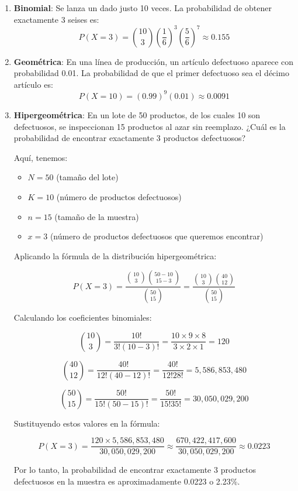 \documentclass[letterpaper, 12pt]{article}
\begin{document}
	\begin{enumerate}
		\item \textbf{Binomial}: Se lanza un dado justo 10 veces. La probabilidad de obtener exactamente 3 seises es:
		\[ P(X = 3) = \binom{10}{3} \left(\frac{1}{6}\right)^3 \left(\frac{5}{6}\right)^7 \approx 0.155 \]
		
		\item \textbf{Geométrica}: En una línea de producción, un artículo defectuoso aparece con probabilidad 0.01. La probabilidad de que el primer defectuoso sea el décimo artículo es:
		\[ P(X = 10) = (0.99)^9 (0.01) \approx 0.0091 \]
		
		\item \textbf{Hipergeométrica}: En un lote de 50 productos, de los cuales 10 son defectuosos, se inspeccionan 15 productos al azar sin reemplazo. ¿Cuál es la probabilidad de encontrar exactamente 3 productos defectuosos?
		
		Aquí, tenemos:
		\begin{itemize}
			\item $N = 50$ (tamaño del lote)
			\item $K = 10$ (número de productos defectuosos)
			\item $n = 15$ (tamaño de la muestra)
			\item $x = 3$ (número de productos defectuosos que queremos encontrar)
		\end{itemize}
		
		Aplicando la fórmula de la distribución hipergeométrica:
		
		$$
		P(X=3) = \frac{\binom{10}{3} \binom{50-10}{15-3}}{\binom{50}{15}} = \frac{\binom{10}{3} \binom{40}{12}}{\binom{50}{15}}
		$$
		
		Calculando los coeficientes binomiales:
		
		$$
		\binom{10}{3} = \frac{10!}{3!(10-3)!} = \frac{10 \times 9 \times 8}{3 \times 2 \times 1} = 120
		$$
		
		$$
		\binom{40}{12} = \frac{40!}{12!(40-12)!} = \frac{40!}{12!28!} = 5,586,853,480
		$$
		
		$$
		\binom{50}{15} = \frac{50!}{15!(50-15)!} = \frac{50!}{15!35!} = 30,050,029,200
		$$
		
		Sustituyendo estos valores en la fórmula:
		
		$$
		P(X=3) = \frac{120 \times 5,586,853,480}{30,050,029,200} \approx \frac{670,422,417,600}{30,050,029,200} \approx 0.0223
		$$
		
		Por lo tanto, la probabilidad de encontrar exactamente 3 productos defectuosos en la muestra es aproximadamente 0.0223 o 2.23\%.
		

\end{enumerate}
\end{document}
